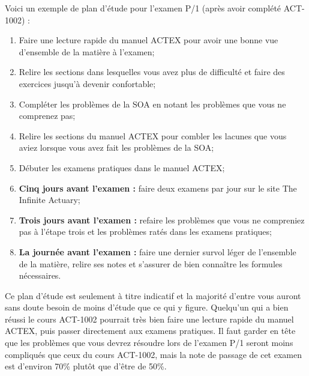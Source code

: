 \documentclass[11pt,french]{article}
\begin{document}
Voici un exemple de plan d'étude pour l'examen P/1 (après avoir complété ACT-1002) :
\begin{enumerate}
\item Faire une lecture rapide du manuel ACTEX pour avoir une bonne vue d'ensemble de la matière à l'examen;
\item Relire les sections dans lesquelles vous avez plus de difficulté et faire des exercices jusqu'à devenir confortable;
\item Compléter les problèmes de la SOA en notant les problèmes que vous ne comprenez pas;
\item Relire les sections du manuel ACTEX pour combler les lacunes que vous aviez lorsque vous avez fait les problèmes de la SOA;
\item Débuter les examens pratiques dans le manuel ACTEX;
\item \textbf{Cinq jours avant l'examen :} faire deux examens par jour sur le site The Infinite Actuary;
\item \textbf{Trois jours avant l'examen :} refaire les problèmes que vous ne compreniez pas à l'étape trois et les problèmes ratés dans les examens pratiques;
\item \textbf{La journée avant l'examen :} faire une dernier survol léger de l'ensemble de la matière, relire ses notes et s'assurer de bien connaître les formules nécessaires.
\end{enumerate}
\vspace{\baselineskip}

Ce plan d'étude est seulement à titre indicatif et la majorité d'entre vous auront sans doute besoin de moins d'étude que ce qui y figure. Quelqu'un qui a bien réussi le cours ACT-1002 pourrait très bien faire une lecture rapide du manuel ACTEX, puis passer directement aux examens pratiques. Il faut garder en tête que les problèmes que vous devrez résoudre lors de l'examen P/1 seront moins compliqués que ceux du cours ACT-1002, mais la note de passage de cet examen est d'environ 70\% plutôt que d'être de 50\%. 

\newpage
\end{document}
